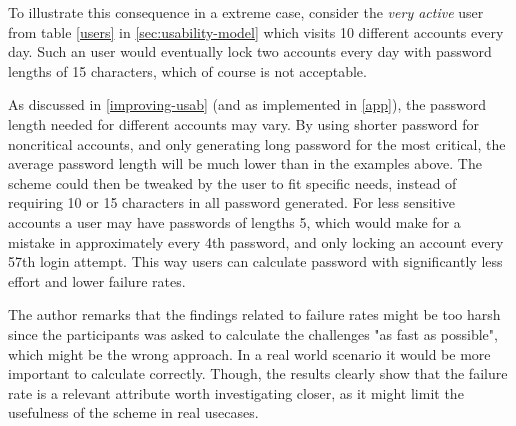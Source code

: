 \par To illustrate this consequence in a extreme case, consider the \emph{very active} user from table \ref{users} in \autoref{sec:usability-model} which visits 10 different accounts every day. Such an user would eventually lock two accounts every day with password lengths of 15 characters, which of course is not acceptable.

\par As discussed in \autoref{improving-usab} (and as implemented in \autoref{app}), the password length needed for different accounts may vary. By using shorter password for noncritical accounts, and only generating long password for the most critical, the average password length will be much lower than in the examples above. The scheme could then be tweaked by the user to fit specific needs, instead of requiring 10 or 15 characters in all password generated. For less sensitive accounts a user may have passwords of lengths 5, which would make for a mistake in approximately every 4th password, and only locking an account every 57th login attempt. This way users can calculate password with significantly less effort and lower failure rates. 



\begin{remark}
    The author remarks that the findings related to failure rates might be too harsh since the participants was asked to calculate the challenges "as fast as possible", which might be the wrong approach. In a real world scenario it would be more important to calculate correctly. Though, the results clearly show that the failure rate is a relevant attribute worth investigating closer, as it might limit the usefulness of the scheme in real usecases.
\end{remark}



